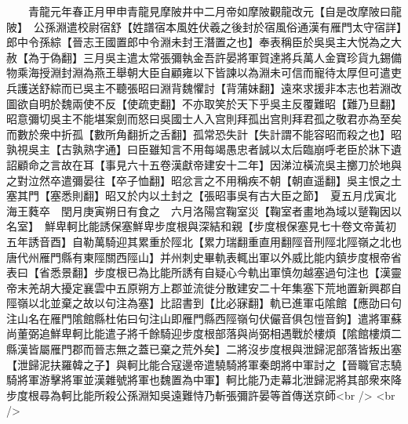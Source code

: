 　　青龍元年春正月甲申青龍見摩陂井中二月帝如摩陂觀龍改元【自是改摩陂曰龍陂】　公孫淵遣校尉宿舒【姓譜宿本風姓伏羲之後封於宿風俗通漢有雁門太守宿詳】郎中令孫綜【晉志王國置郎中令淵未封王潛置之也】奉表稱臣於吳吳主大悦為之大赦【為于偽翻】三月吳主遣太常張彌執金吾許晏將軍賀達將兵萬人金寶珍貨九錫備物乘海授淵封淵為燕王舉朝大臣自顧雍以下皆諫以為淵未可信而寵待太厚但可遣吏兵護送舒綜而已吳主不聽張昭曰淵背魏懼討【背蒲妹翻】遠來求援非本志也若淵改圖欲自明於魏兩使不反【使疏吏翻】不亦取笑於天下乎吳主反覆難昭【難乃旦翻】昭意彌切吳主不能堪案劍而怒曰吳國士人入宫則拜孤出宫則拜君孤之敬君亦為至矣而數於衆中折孤【數所角翻折之舌翻】孤常恐失計【失計謂不能容昭而殺之也】昭孰視吳主【古孰熟字通】曰臣雖知言不用每竭愚忠者誠以太后臨崩呼老臣於牀下遺詔顧命之言故在耳【事見六十五卷漢獻帝建安十二年】因涕泣橫流吳主擲刀於地與之對泣然卒遣彌晏往【卒子恤翻】昭忿言之不用稱疾不朝【朝直遥翻】吳主恨之土塞其門【塞悉則翻】昭又於内以土封之【張昭事吳有古大臣之節】　夏五月戊寅北海王蕤卒　閏月庚寅朔日有食之　六月洛陽宫鞠室災【鞠室者畫地為域以蹵鞠因以名室】　鮮卑軻比能誘保塞鮮卑步度根與深結和親【步度根保塞見七十卷文帝黃初五年誘音酉】自勒萬騎迎其累重於陘北【累力瑞翻重直用翻陘音刑陘北陘嶺之北也唐代州雁門縣有東陘關西陘山】并州刺史畢軌表輒出軍以外威比能内鎮步度根帝省表曰【省悉景翻】步度根已為比能所誘有自疑心今軌出軍慎勿越塞過句注也【漢靈帝末羌胡大擾定襄雲中五原朔方上郡並流徙分散建安二十年集塞下荒地置新興郡自陘嶺以北並棄之故以句注為塞】比詔書到【比必寐翻】軌已進軍屯隂館【應劭曰句注山名在雁門隂館縣杜佑曰句注山即雁門縣西陘嶺句伏儼音俱包愷音鉤】遣將軍蘇尚董弼追鮮卑軻比能遣子將千餘騎迎步度根部落與尚弼相遇戰於樓煩【隂館樓煩二縣漢皆屬雁門郡而晉志無之蓋已棄之荒外矣】二將沒步度根與泄歸泥部落皆叛出塞【泄歸泥扶羅韓之子】與軻比能合寇邊帝遣驍騎將軍秦朗將中軍討之【晉職官志驍騎將軍游擊將軍並漢雜號將軍也魏置為中軍】軻比能乃走幕北泄歸泥將其部衆來降步度根尋為軻比能所殺公孫淵知吳遠難恃乃斬張彌許晏等首傳送京師<br />
<br />
